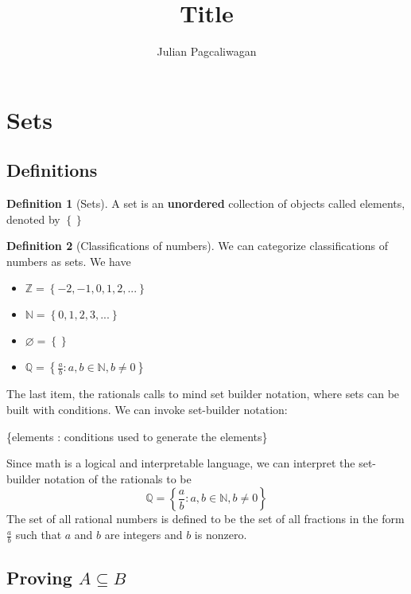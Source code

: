 \documentclass{report}
\title{Title}
\author{Julian Pagcaliwagan}
\date{}
\theoremstyle{definition}
\newtheorem{definition}{Definition}
\begin{document}
    \maketitle
    \section*{Sets}
    \subsection*{Definitions}
        \begin{definition}[Sets]
            A set is an \textbf{unordered} collection of objects called elements, denoted by $ \left\{ \right\} $
        \end{definition}

        \begin{definition}[Classifications of numbers]
            We can categorize classifications of numbers as sets. We have
            \begin{itemize}
                \item $ \mathbb{Z} = \left\{ -2, -1, 0, 1, 2, ... \right\} $
                \item $ \mathbb{N} = \left\{ 0, 1, 2, 3, ... \right\} $
                \item $ \varnothing = \left\{  \right\} $
                \item $ \mathbb{Q} = \left\{ \frac{a}{b}: a, b \in \mathbb{N}, b \neq 0 \right\} $
            \end{itemize}
        \end{definition}

        \noindent The last item, the rationals calls to mind set builder notation, where sets can be built with conditions.
        We can invoke set-builder notation: 
        \begin{center}
            \{elements : conditions used to generate the elements\}
        \end{center}

        Since math is a logical and interpretable language, we can interpret the set-builder notation of the rationals to be
        \[
            \mathbb{Q} = \left\{ \frac{a}{b}: a, b \in \mathbb{N}, b \neq 0 \right\}
        \]
        The set of all rational numbers is defined to be the set of all fractions in the form $\frac{a}{b}$ such that $a$ and $ b $ are integers and $ b $ is nonzero.

    \subsection*{Proving $ A \subseteq B $}
    
    
\end{document}

